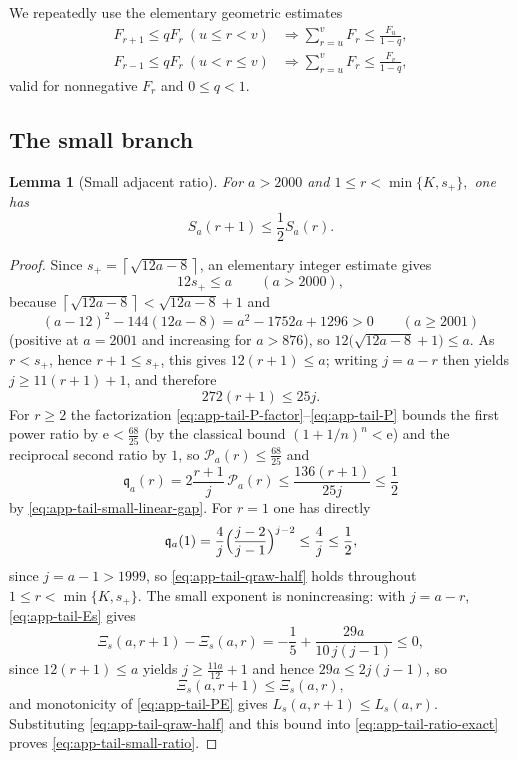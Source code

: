 \documentclass[11pt]{article}
\newtheorem{lemma}[theorem]{Lemma}
\theoremstyle{definition}
\theoremstyle{remark}
\newcommand{\e}{\mathrm e}
\newcommand{\ceil}[1]{\left\lceil #1\right\rceil}
\begin{document}
We repeatedly use the elementary geometric estimates
\begin{align}
 F_{r+1}\le qF_r\ (u\le r<v)
 &\Longrightarrow
 \sum_{r=u}^{v}F_r\le\frac{F_u}{1-q},
 \label{eq:app-tail-forward-geom}\\
 F_{r-1}\le qF_r\ (u<r\le v)
 &\Longrightarrow
 \sum_{r=u}^{v}F_r\le\frac{F_v}{1-q},
 \label{eq:app-tail-reverse-geom}
\end{align}
valid for nonnegative $F_r$ and $0\le q<1$.

\subsection{The small branch}

\begin{lemma}[Small adjacent ratio]\label{lem:app-tail-small-ratio}
For $a>2000$ and
\(
 1\le r<\min\{K,s_+\},
\)
one has
\begin{equation}\label{eq:app-tail-small-ratio}
 S_a(r+1)\le\frac12S_a(r).
\end{equation}
\end{lemma}

\begin{proof}
Since $s_+=\ceil{\sqrt{12a-8}}$, an elementary integer estimate gives
\begin{equation}\label{eq:app-tail-small-cutoff}
 12s_+\le a\qquad(a>2000),
\end{equation}
because $\ceil{\sqrt{12a-8}}<\sqrt{12a-8}+1$ and
\[
 (a-12)^2-144(12a-8)=a^2-1752a+1296>0\qquad(a\ge2001)
\]
(positive at $a=2001$ and increasing for $a>876$), so
$12\bigl(\sqrt{12a-8}+1\bigr)\le a$.  As $r<s_+$, hence
$r+1\le s_+$, this gives $12(r+1)\le a$; writing $j=a-r$ then yields
$j\ge11(r+1)+1$, and therefore
\begin{equation}\label{eq:app-tail-small-linear-gap}
 272(r+1)\le25j.
\end{equation}
For $r\ge2$ the factorization
\eqref{eq:app-tail-P-factor}--\eqref{eq:app-tail-P} bounds the first power ratio
by $\e<\tfrac{68}{25}$ (by the classical bound $(1+1/n)^n<\e$) and the reciprocal
second ratio by $1$, so $\mathcal P_a(r)\le\tfrac{68}{25}$ and
\begin{equation}\label{eq:app-tail-qraw-half}
 \mathfrak q_a(r)=2\frac{r+1}{j}\,\mathcal P_a(r)
 \le\frac{136(r+1)}{25j}\le\frac12
\end{equation}
by \eqref{eq:app-tail-small-linear-gap}.  For $r=1$ one has directly
\[
 \mathfrak q_a(1)=\frac4j\Bigl(\frac{j-2}{j-1}\Bigr)^{j-2}\le\frac4j\le\frac12,
\]
since $j=a-1>1999$, so \eqref{eq:app-tail-qraw-half} holds throughout
$1\le r<\min\{K,s_+\}$.  The small exponent is nonincreasing: with $j=a-r$,
\eqref{eq:app-tail-Es} gives
\[
 \Xi_s(a,r+1)-\Xi_s(a,r)=-\frac15+\frac{29a}{10\,j(j-1)}\le0,
\]
since $12(r+1)\le a$ yields $j\ge\tfrac{11a}{12}+1$ and hence $29a\le2j(j-1)$, so
\begin{equation}\label{eq:app-tail-Es-mono}
 \Xi_s(a,r+1)\le \Xi_s(a,r),
\end{equation}
and monotonicity of \eqref{eq:app-tail-PE} gives $L_s(a,r+1)\le L_s(a,r)$.
Substituting \eqref{eq:app-tail-qraw-half} and this bound into
\eqref{eq:app-tail-ratio-exact} proves \eqref{eq:app-tail-small-ratio}.
\end{proof}
\end{document}

